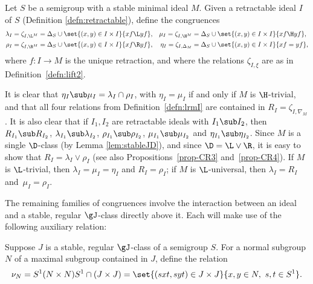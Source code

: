 \begin{definition}
\label{defn:lrmI}
Let $S$ be a semigroup with a stable minimal ideal $M$.  Given a retractable ideal $I$ of $S$ (Definition \ref{defn:retractable}), define the congruences
\begin{align*}
\lambda_I=\zeta_{I,{\L^M}}&=\Delta_S\cup\set{ (x,y)\in I\times I}{ xf\L yf},
  &\mu_I=\zeta_{I,{\H^M}}&=\Delta_S\cup\set{ (x,y)\in I\times I}{ xf\H yf},\\
%
\rho_I=\zeta_{I,{\R^M}}&=\Delta_S\cup\set{ (x,y)\in I\times I}{ xf\R yf},
  &\eta_I=\zeta_{I,\Delta_M}&=\Delta_S\cup\set{ (x,y)\in I\times I}{ xf= yf},
\end{align*}
where $f:I\to M$ is the unique retraction, and where the relations $\zeta_{I,\xi}$ are as in Definition~\ref{defn:lift2}.
\end{definition}

It is clear that $\eta_I\sub\mu_I=\lambda_I\cap\rho_I$, with $\eta_I=\mu_I$ if and only if $M$ is $\H$-trivial, and that all four relations from Definition~\ref{defn:lrmI} are contained in $R_I=\zeta_{I,\nabla_M}$.
It is also clear that if $I_1,I_2$ are retractable ideals with $I_1\sub I_2$, then $R_{I_1}\sub R_{I_2}$, $\lambda_{I_1}\sub \lambda_{I_2}$, $\rho_{I_1}\sub \rho_{I_2}$, $\mu_{I_1}\sub \mu_{I_2}$ and $\eta_{I_1}\sub \eta_{I_2}$.  Since $M$ is a single $\D$-class (by Lemma \ref{lem:stableJD}), and since ${\D}={\L}\vee{\R}$, it is easy to show that $R_I=\lambda_I\vee\rho_I$ (see also Propositions~\ref{prop-CR3} and~\ref{prop-CR4}).  If $M$ is $\L$-trivial, then $\lambda_I=\mu_I=\eta_I$ and $R_I=\rho_I$; if $M$ is $\L$-universal, then $\lambda_I=R_I$ and~$\mu_I=\rho_I$.

The remaining families of congruences involve the interaction between an ideal and a stable, regular $\gJ$-class directly above it.  Each will make use of the following auxiliary relation:

\begin{definition}
\label{Rel-nu}
Suppose $J$ is a stable, regular $\gJ$-class of a semigroup $S$.  For a normal subgroup $N$ of a maximal subgroup contained in $J$, define the relation
\[
\nu_N = S^1(N\times N)S^1\cap(J\times J) = \set{ (sxt,syt)\in J\times J}{ x,y\in N,\ s,t\in S^1}.
\]
\end{definition}

